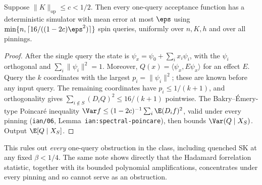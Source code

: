 \begin{theorem}\label{dist:one-query}
Suppose \(\|K\|_{\mathrm{op}}\le c<1/2\). Then every one-query acceptance
function has a deterministic simulator with mean error at most \(\eps\) using
\(\min\{n,\lceil16/((1-2c)\eps^2)\rceil\}\) spin queries, uniformly over
\(n,K,h\) and over all pinnings.
\end{theorem}
\begin{proof}
After the single query the state is \(\psi_x=\psi_0+\sum_ix_i\psi_i\), with the
\(\psi_i\) orthogonal and \(\sum_i\|\psi_i\|^2=1\). Moreover,
\(Q(x)=\langle\psi_x,E\psi_x\rangle\) for an effect \(E\). Query the \(k\)
coordinates with the largest \(p_i=\|\psi_i\|^2\); these are known before any
input query. The remaining coordinates have \(p_i\le1/(k+1)\), and
orthogonality gives \(\sum_{i\notin S}(D_iQ)^2\le16/(k+1)\) pointwise. The
Bakry--Émery-type Poincaré inequality
\(\Var f\le(1-2c)^{-1}\sum_i\E(D_if)^2\), valid under every pinning
(\texttt{ian/06}, Lemma~\texttt{ian:spectral-poincare}), then bounds
\(\Var(Q\mid X_S)\). Output \(\E[Q\mid X_S]\).
\end{proof}
This rules out \emph{every} one-query obstruction in the class, including
quenched SK at any fixed \(\beta<1/4\). The same note shows directly that the
Hadamard forrelation statistic, together with its bounded polynomial
amplifications, concentrates under every pinning and so cannot serve as an
obstruction.

